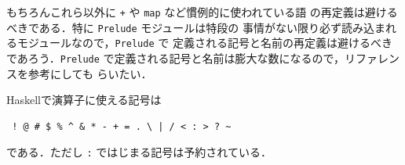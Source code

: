 \documentclass[a5paper,twoside,fleqn,draft]{jsbook}
\newcommand{\programminglanguage}[1]{\textsf{#1}}
\newcommand{\haskell}{\programminglanguage{Haskell}}
\newcommand{\code}[1]{\texttt{#1}}
\newcommand{\filename}[1]{\texttt{#1}}
\begin{document}
もちろんこれら以外に \code{+} や \code{map} など慣例的に使われている語
の再定義は避けるべきである．特に \filename{Prelude} モジュールは特段の
事情がない限り必ず読み込まれるモジュールなので，\filename{Prelude} で
定義される記号と名前の再定義は避けるべきであろう．\filename{Prelude}
で定義される記号と名前は膨大な数になるので，リファレンスを参考にしても
らいたい．

\haskell で演算子に使える記号は
\begin{verbatim}
 ! @ # $ % ^ & * - + = . \ | / < : > ? ~
\end{verbatim}%
である．ただし \code{:} ではじまる記号は予約されている．

\end{document}
